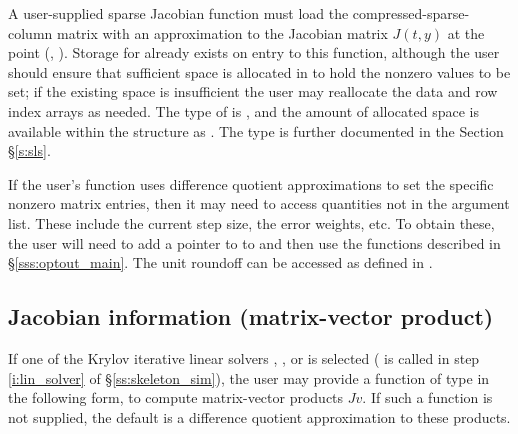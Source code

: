 {
  A user-supplied sparse Jacobian function must load the
  compressed-sparse-column matrix  with an approximation to
  the Jacobian matrix $J(t,y)$ at the point (, ).  Storage
  for  already exists on entry to this function, although the
  user should ensure that sufficient space is allocated in  to
  hold the nonzero values to be set; if the existing space is
  insufficient the user may reallocate the data and row index arrays
  as needed.  The type of  is , and the amount of
  allocated space is available within the  structure as
  .  The  type is further documented in the Section
  \S\ref{s:sls}.
 
  If the user's  function uses difference quotient
  approximations to set the specific nonzero matrix entries, then it
  may need to access quantities not in the argument list. These
  include the current step size, the error weights, etc.
  To obtain these, the user will need to add a pointer to  
  to  and then use the  functions described in
  \S\ref{sss:optout_main}. The unit roundoff can be accessed as
   defined in .
}


\subsection{Jacobian information (matrix-vector product)}\label{ss:jtimesFn}

If one of the Krylov iterative linear solvers {\spgmr}, {\spbcg}, or {\sptfqmr}
is selected ( is called in step \ref{i:lin_solver} of
\S\ref{ss:skeleton_sim}), the user may provide a function of type
 in the following form,
to compute matrix-vector products $Jv$. If such a function is not supplied,
the default is a difference quotient approximation to these products.

